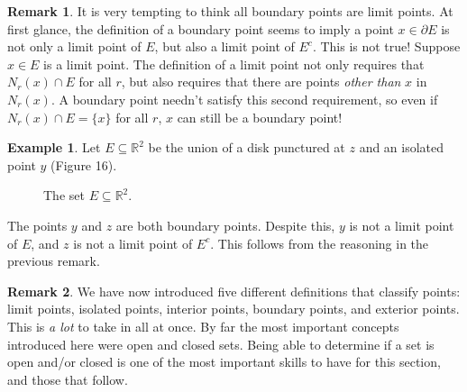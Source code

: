 \documentclass{article}
\newcommand{\R}{\mathbb{R}}
\theoremstyle{definition}
\newtheorem{example}{Example}[section]
\newtheorem{remark}{Remark}[section]
\begin{document}
\begin{remark}
	It is very tempting to think all boundary points are limit points. At first glance, the definition of a boundary point seems to imply a point $ x\in\partial E $ is not only a limit point of $ E $, but also a limit point of $ E^c $. This is not true! Suppose $ x\in E $ is a limit point. The definition of a limit point not only requires that $ N_r(x)\cap E $ for all $ r $, but also requires that there are points \textit{other than} $ x $ in $ N_r(x) $. A boundary point needn't satisfy this second requirement, so even if $ N_r(x)\cap E=\{x\} $ for all $ r $, $ x $ can still be a boundary point! 
\end{remark}

\begin{example}
	Let $ E\subseteq \R^2 $ be the union of a disk punctured at $ z $ and an isolated point $ y $ (Figure 16).  
	\begin{figure}[h]
		\centering
		\caption{The set $ E\subseteq \R^2 $.}
	\end{figure}

The points $ y $ and $ z $ are both boundary points. Despite this, $ y $ is not a limit point of $ E $, and $ z $ is not a limit point of $ E^c $. This follows from the reasoning in the previous remark.  	
\end{example}

\begin{remark}
	We have now introduced five different definitions that classify points: limit points, isolated points, interior points, boundary points, and exterior points. This is \textit{a lot} to take in all at once. By far the most important concepts introduced here were open and closed sets. Being able to determine if a set is open and/or closed is one of the most important skills to have for this section, and those that follow. 
\end{remark}
\end{document}
